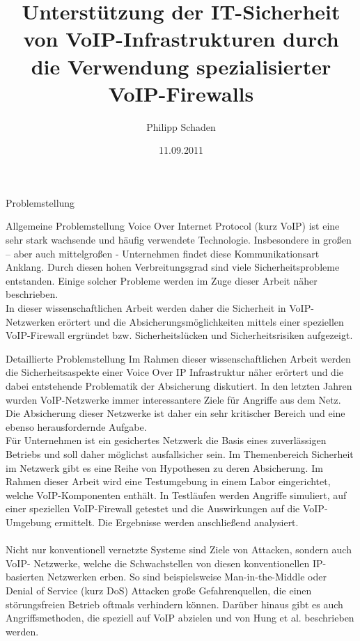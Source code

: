 \documentclass[a4paper,11pt,ngerman]{INSOexpose}
\title{Unterstützung der IT-Sicherheit von VoIP-Infrastrukturen durch die Verwendung spezialisierter VoIP-Firewalls}
\author{Philipp Schaden}
\date{11.09.2011}
\begin{document}
\maketitle

\begin{section}{Problemstellung}
\begin{subsection}{Allgemeine Problemstellung}
Voice Over Internet Protocol (kurz VoIP) ist eine sehr stark wachsende und häufig verwendete Technologie. Insbesondere in großen – aber auch mittelgroßen - Unternehmen findet diese Kommunikationsart Anklang.
Durch diesen hohen Verbreitungsgrad sind viele Sicherheitsprobleme entstanden.
Einige solcher Probleme werden im Zuge dieser Arbeit näher beschrieben.
\\
In dieser wissenschaftlichen Arbeit werden daher die Sicherheit in VoIP-Netzwerken erörtert und die Absicherungsmöglichkeiten mittels einer speziellen VoIP-Firewall ergründet bzw. Sicherheitslücken und Sicherheitsrisiken aufgezeigt.
\end{subsection}
\begin{subsection}{Detaillierte Problemstellung}
Im Rahmen dieser wissenschaftlichen Arbeit werden die Sicherheitsaspekte einer Voice Over IP Infrastruktur näher erörtert und die dabei entstehende Problematik der Absicherung diskutiert.
In den letzten Jahren wurden VoIP-Netzwerke immer interessantere Ziele für Angriffe aus dem Netz. Die Absicherung dieser Netzwerke ist daher ein sehr kritischer Bereich und eine ebenso herausfordernde Aufgabe.
\\
Für Unternehmen ist ein gesichertes Netzwerk die Basis eines zuverlässigen Betriebs und soll daher möglichst ausfallsicher sein.
Im Themenbereich Sicherheit im Netzwerk gibt es eine Reihe von Hypothesen zu deren Absicherung. Im Rahmen dieser Arbeit wird eine Testumgebung in einem Labor eingerichtet, welche VoIP-Komponenten enthält. In Testläufen werden Angriffe simuliert, auf einer speziellen VoIP-Firewall getestet und die Auswirkungen auf die VoIP-Umgebung ermittelt.
Die Ergebnisse werden anschließend analysiert.
\\
\\
Nicht nur konventionell vernetzte Systeme sind Ziele von Attacken, sondern auch VoIP- Netzwerke, welche die Schwachstellen von diesen konventionellen IP-basierten Netzwerken erben.
So sind beispielsweise Man-in-the-Middle oder Denial of Service (kurz DoS) Attacken große Gefahrenquellen, die einen störungsfreien Betrieb oftmals verhindern können. Darüber hinaus gibt es auch Angriffsmethoden, die speziell auf VoIP abzielen und von Hung et al. beschrieben werden.
\cite{Hung:2006:seciss} \\ 
\end{subsection}
\end{section}
\pagebreak
\end{document}
